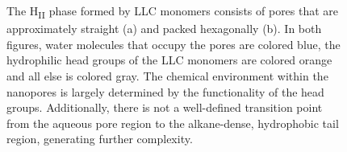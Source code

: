 \documentclass[journal=jpcbfk,manuscript=article]{achemso}
\begin{document}
\begin{figure}
\begin{subfigure}{0.45\textwidth}
  \caption{}
  \end{subfigure}
  \caption{The H\textsubscript{II} phase formed by LLC monomers consists of pores
  that are approximately straight (a) and packed hexagonally (b). In both figures,
  water molecules that occupy the pores are colored blue, the hydrophilic head 
  groups of the LLC monomers are colored orange and all else is colored gray. 
  The chemical environment within the nanopores is largely determined by the functionality
  of the head groups. Additionally, there is not a well-defined transition
  point from the aqueous pore region to the alkane-dense, hydrophobic tail region,
  generating further complexity.
  }\label{fig:membrane_rendering}
  \end{figure}
\end{document}
